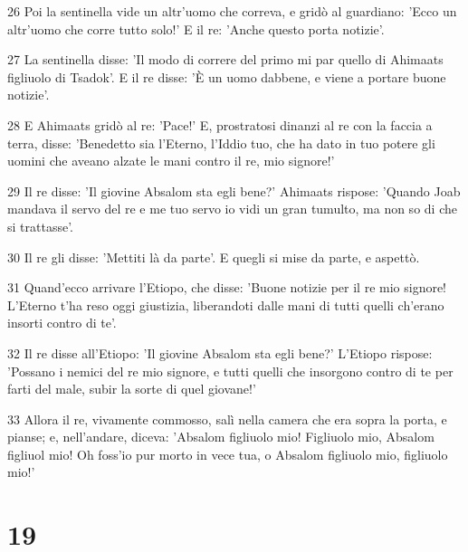\par 26 Poi la sentinella vide un altr'uomo che correva, e gridò al guardiano: 'Ecco un altr'uomo che corre tutto solo!' E il re: 'Anche questo porta notizie'.
\par 27 La sentinella disse: 'Il modo di correre del primo mi par quello di Ahimaats figliuolo di Tsadok'. E il re disse: 'È un uomo dabbene, e viene a portare buone notizie'.
\par 28 E Ahimaats gridò al re: 'Pace!' E, prostratosi dinanzi al re con la faccia a terra, disse: 'Benedetto sia l'Eterno, l'Iddio tuo, che ha dato in tuo potere gli uomini che aveano alzate le mani contro il re, mio signore!'
\par 29 Il re disse: 'Il giovine Absalom sta egli bene?' Ahimaats rispose: 'Quando Joab mandava il servo del re e me tuo servo io vidi un gran tumulto, ma non so di che si trattasse'.
\par 30 Il re gli disse: 'Mettiti là da parte'. E quegli si mise da parte, e aspettò.
\par 31 Quand'ecco arrivare l'Etiopo, che disse: 'Buone notizie per il re mio signore! L'Eterno t'ha reso oggi giustizia, liberandoti dalle mani di tutti quelli ch'erano insorti contro di te'.
\par 32 Il re disse all'Etiopo: 'Il giovine Absalom sta egli bene?' L'Etiopo rispose: 'Possano i nemici del re mio signore, e tutti quelli che insorgono contro di te per farti del male, subir la sorte di quel giovane!'
\par 33 Allora il re, vivamente commosso, salì nella camera che era sopra la porta, e pianse; e, nell'andare, diceva: 'Absalom figliuolo mio! Figliuolo mio, Absalom figliuol mio! Oh foss'io pur morto in vece tua, o Absalom figliuolo mio, figliuolo mio!'

\chapter{19}

